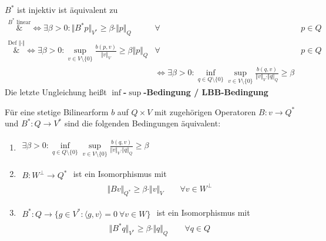$B^\ast$ ist injektiv ist äquivalent zu
\begin{align*}
	\overset{B^\ast\text{ linear}}&{\Longleftrightarrow}
	\exists\beta>0:\big\Vert B^\ast p\big\Vert_{V^\ast}\geq\beta\cdot\Vert p\Vert_Q &\forall& p\in Q\\
	\overset{\text{Def }\Vert\cdot\Vert}&\Longleftrightarrow \exists\beta>0:
	\sup\limits_{v\in V\setminus\lbrace0\rbrace}\frac{b(p,v)}{\Vert v\Vert_V}\geq\beta\Vert p\Vert_Q &\forall&p\in Q\\
	&\Longleftrightarrow\exists\beta>0:
	\inf\limits_{q\in Q\setminus\lbrace0\rbrace}\sup\limits_{v\in V\setminus\lbrace0\rbrace}\frac{b(q,v)}{\Vert v\Vert_V\cdot\Vert q\Vert_Q}\geq\beta
\end{align*}
Die letzte Ungleichung heißt \textbf{$\inf$-$\sup$-Bedingung / LBB-Bedingung}
\setcounter{satz}{-1}
\begin{satz}\label{theorem8.0infsupAequivalenz}%
	Für eine stetige Bilinearform $b$ auf $Q\times V$ mit zugehörigen Operatoren
	$B\colon v\to Q^\ast$ und $B^\ast\colon Q\to V^\ast$ sind die folgenden Bedingungen äquivalent:
	\begin{enumerate}[label=(\roman*)]
		\item $\begin{aligned}
			\exists\beta>0:\inf\limits_{q\in Q\setminus\lbrace0\rbrace}\sup\limits_{v\in V\setminus\lbrace 0\rbrace}\frac{b(q,v)}{\Vert v\Vert_V\cdot\Vert q\Vert_Q}\geq\beta
		\end{aligned}$
		\item $\begin{aligned}
			B\colon W^\perp\to Q^\ast
		\end{aligned}$ ist ein Isomorphismus mit
		\begin{align*}
			\Vert B v\Vert_{Q^\ast}\geq\beta\cdot\Vert v\Vert_V\qquad\forall v\in W^\perp
		\end{align*}
		\item $\begin{aligned}
			B^\ast\colon Q\to\big\lbrace g\in V^\ast:\langle g,v\rangle=0~\forall v\in W\big\rbrace
		\end{aligned}$ ist ein Isomorphismus mit
		\begin{align*}
			\big\Vert B^\ast q\big\Vert_{V^\ast}\geq\beta\cdot\Vert q\Vert_Q\qquad\forall q\in Q
		\end{align*}
	\end{enumerate}
\end{satz}

